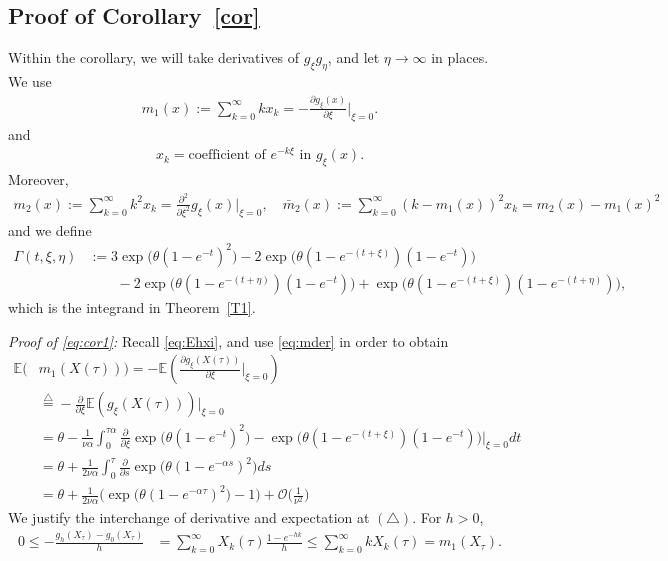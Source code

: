 \documentclass{imsart}
\theoremstyle{plain}
\theoremstyle{definition}
\begin{document}
\subsection{Proof of Corollary~\ref{cor}}
Within the corollary, we will take derivatives of $g_\xi g_\eta$, and let $\eta\to\infty$ in places. We use 
\begin{align}\label{eq:mder}
    m_1(x) := \sum_{k=0}^\infty kx_k = - \frac{\partial g_\xi(x)}{\partial \xi}\Big|_{\xi = 0}.
\end{align}
and
\begin{align}\label{eq:mder2}
    x_k = \text{coefficient of } e^{- k \xi} \text{ in } g_\xi(x).
\end{align}
Moreover, 
\begin{align}
    m_2(x) := \sum_{k=0}^\infty k^2 x_k = \frac{\partial^2}{\partial \xi^2} g_\xi(x)\big|_{\xi = 0}, \quad \bar m_2(x) := \sum_{k=0}^\infty (k - m_1(x))^2 x_k = m_2(x) - m_1(x)^2 
\end{align}
and we define 
\begin{equation}
\label{eq:Gamma}
\begin{aligned}
    \Gamma(t, \xi, \eta) &:= 3 \exp\Big(\theta(1 - e^{-t})^2 \Big) - 2 \exp\Big(\theta(1 - e^{- (t + \xi)})(1 - e^{-t}) \Big) \\ & \qquad - 2 \exp\Big(\theta(1 - e^{-(t + \eta)})(1 - e^{-t}) \Big) + \exp\Big( \theta(1 - e^{-(t + \xi)})(1 - e^{-(t + \eta)})\Big),
\end{aligned}    
\end{equation}
which is the integrand in Theorem~\ref{T1}. 

\noindent\emph{Proof of \eqref{eq:cor1}:} Recall \eqref{eq:Ehxi}, and use \eqref{eq:mder} in order to obtain \begin{align*}
    \mathbb E\big(&m_1(X(\tau))\big) = -\mathbb E\left(\frac{\partial g_\xi(X(\tau))}{\partial \xi} \bigg|_{\xi = 0}\right)\\
&\overset{\triangle}= - \frac{\partial}{\partial \xi}  \mathbb E\left(g_\xi(X(\tau))\right)\bigg|_{\xi = 0}\\
    &= \theta - \frac 1{\nu \alpha} \int_0^{\tau \alpha} \frac{\partial}{\partial \xi} \exp\Big(\theta(1 - e^{-t})^2 \Big) - \exp\Big(\theta(1 - e^{-(t + \xi)})(1 - e^{-t}) \Big) \Big|_{\xi = 0} dt \\ & = \theta + \frac{1}{2\nu \alpha} \int_0^\tau \frac{\partial}{\partial s} \exp\Big( \theta(1 - e^{-\alpha s})^2 \Big) ds \\ & = \theta +  \frac{1}{2\nu \alpha} 
  \Big(\exp\big(\theta (1-e^{-\alpha \tau })^2\big) - 1\Big) + \mathcal O\Big(\frac{1}{\nu^2}\Big)
\end{align*}
We justify the interchange of derivative and expectation at $(\triangle)$. For $h>0$,
\begin{align*}
0 \leq -\frac{g_h(X_\tau)-g_0(X_\tau)}{h}
&=
\sum_{k=0}^\infty X_k(\tau)\frac{1-e^{-hk}}{h} \leq
\sum_{k=0}^\infty kX_k(\tau)
=
m_1(X_\tau).
\end{align*}
\end{document}
